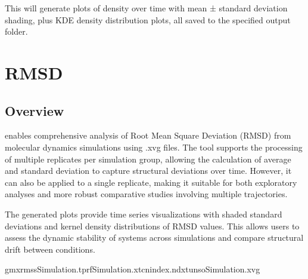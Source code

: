 \documentclass[a4paper,10pt,english]{sphinxmanual}
\begin{document}
\sphinxAtStartPar
This will generate plots of density over time with mean ± standard deviation shading, plus KDE density distribution plots, all saved to the specified output folder.

\sphinxstepscope


\chapter{RMSD}
\label{\detokenize{RMSD:rmsd}}\label{\detokenize{RMSD::doc}}

\section{Overview}
\label{\detokenize{RMSD:overview}}
\sphinxAtStartPar
{} enables comprehensive analysis of Root Mean Square Deviation (RMSD) from molecular dynamics simulations using .xvg files. The tool supports the processing of multiple replicates per simulation group, allowing the calculation of average and standard deviation to capture structural deviations over time. However, it can also be applied to a single replicate, making it suitable for both exploratory analyses and more robust comparative studies involving multiple trajectories.

\sphinxAtStartPar
The generated plots provide time series visualizations with shaded standard deviations and kernel density distributions of RMSD values. This allows users to assess the dynamic stability of systems across simulations and compare structural drift between conditions.

\sphinxAtStartPar
{}

\begin{sphinxVerbatim}[commandchars=\\\{\}]
gmxrms\PYGZhy{}sSimulation.tpr\PYGZhy{}fSimulation.xtc\PYGZhy{}nindex.ndx\PYGZhy{}tuns\PYGZhy{}oSimulation.xvg
\end{sphinxVerbatim}

\begin{sphinxVerbatim}[commandchars=\\\{\}]
   
\end{sphinxVerbatim}
\end{document}
